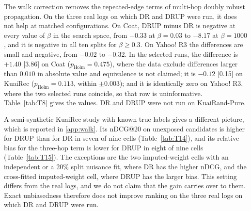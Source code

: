The walk correction removes the repeated-edge terms of multi-hop doubly robust propagation. On the three real logs on
which DR and DRUP were run, it does not help at matched configurations. On Coat, DRUP minus DR is negative at every
value of $\beta$ in the search space, from $-0.33$ at $\beta=0.03$ to $-8.17$ at $\beta=1000$, and it is negative in all
ten splits for $\beta\geq0.3$. On Yahoo! R3 the differences are small and negative, from $-0.02$ to $-0.32$. In the
selected runs, the difference is $+1.40$ [3.86] on Coat ($p_\mathrm{Holm}=0.475$), where the data exclude differences
larger than $0.010$ in absolute value and equivalence is not claimed; it is $-0.12$ [0.15] on KuaiRec ($p_\mathrm{Holm}=0.113$,
within $\pm0.003$); and it is identically zero on Yahoo! R3, where the two selected runs coincide, so that row is
uninformative. Table~\ref{tab:T8} gives the values. DR and DRUP were not run on KuaiRand-Pure.



A semi-synthetic KuaiRec study with known true labels gives a different picture, which is reported in
\ref{app:walk}. Its nDCG@20 on unexposed candidates is higher for DRUP than for DR in seven of nine cells
(Table~\ref{tab:T14}), and its relative bias for the three-hop term is lower for DRUP in eight of nine cells
(Table~\ref{tab:T15}). The exceptions are the two imputed-weight cells with an independent or a 20\% split nuisance fit,
where DR has the higher nDCG, and the cross-fitted imputed-weight cell, where DRUP has the larger bias. This setting
differs from the real logs, and we do not claim that the gain carries over to them. Exact unbiasedness therefore does
not improve ranking on the three real logs on which DR and DRUP were run.
